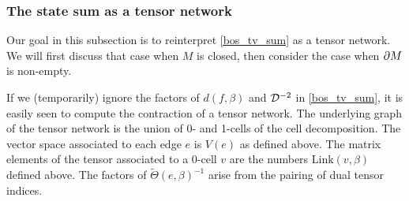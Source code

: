 

\subsubsection{The state sum as a tensor network}

Our goal in this subsection is to reinterpret \eqref{bos_tv_sum} as a tensor network.
We will first discuss that case when $M$ is closed, then consider the case when $\partial M$ is non-empty.

\medskip

If we (temporarily) ignore the factors of $d(f, \beta)$ and $\mathcal{D}^{-2}$ in \eqref{bos_tv_sum}, 
it is easily seen to compute the contraction of a tensor network.
The underlying graph of the tensor network is the union of 0- and 1-cells of the cell decomposition.
The vector space associated to each edge $e$ is $V(e)$ as defined above.
The matrix elements of the tensor associated to a 0-cell $v$ are the numbers $\text{Link}(v, \beta)$ defined above.
The factors of $\widetilde\Theta(e, \beta)^{-1}$ arise from the pairing of dual tensor indices.

